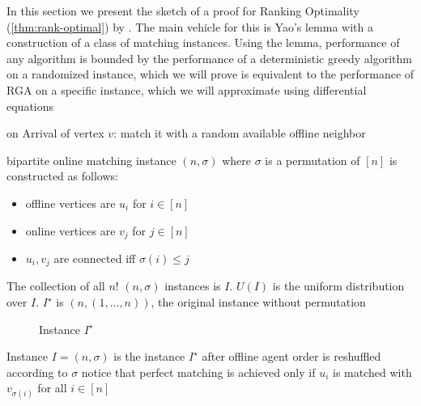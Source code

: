 \label{section:rank-opt}
In this section we present the sketch of a proof for Ranking Optimality (\autoref{thm:rank-optimal}) by \cite{karp}. The main vehicle for this is Yao's lemma with a construction of a class of matching instances. Using the lemma, performance of any algorithm is bounded by the performance of a deterministic greedy algorithm on a randomized instance, which we will prove is equivalent to the performance of RGA on a specific instance, which we will approximate using differential equations

\begin{algorithm}
	\caption{RGA}
	\label{alg:RGA}
	\begin{algorithmic}
		\item on Arrival of vertex $v$: match it with a random available offline neighbor
	\end{algorithmic}
\end{algorithm}

\begin{definition}
	bipartite online matching instance $(n,\sigma)$ where $\sigma$ is a permutation of $[n]$ is constructed as follows:
	\begin{itemize}
		\item offline vertices are $u_i$ for $i\in[n]$
		\item online vertices are $v_j$ for $j\in[n]$
		\item $u_i,v_j$ are connected iff $\sigma(i)\leq j$
	\end{itemize}
\end{definition}
The collection of all $n!$ $(n,\sigma)$ instances is $I$. $U(I)$ is the uniform distribution over $I$. $I^\star$ is $(n,(1,\dots,n))$, the original instance without permutation
\begin{figure}[H]
	\centering
	
	\caption{Instance $I^\star$}
\end{figure}
Instance $I=(n,\sigma)$ is the instance $I^\star$ after offline agent order is reshuffled according to $\sigma$
notice that perfect matching is achieved only if $u_i$ is matched with $v_{\sigma(i)}$ for all $i\in[n]$\\

